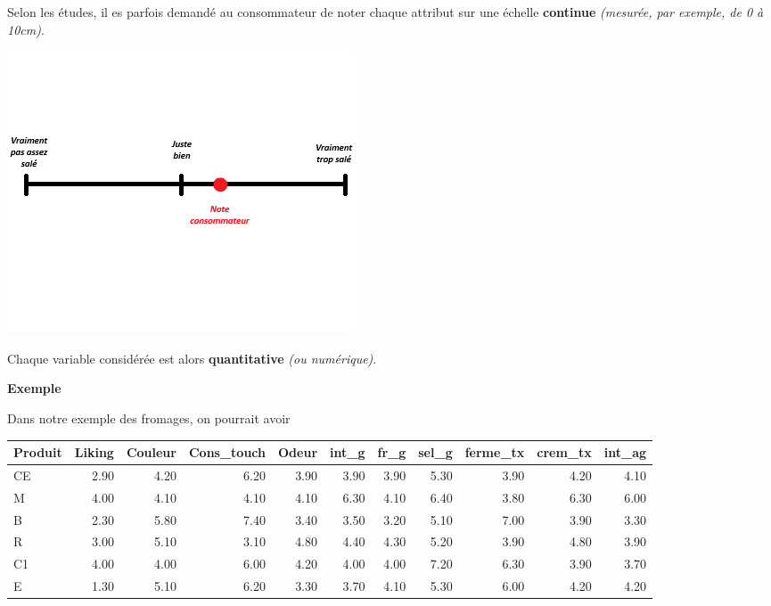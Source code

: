 \documentclass[aspectratio=169,xcolor=dvipsnames]{beamer}
\begin{document}
\begin{frame}

\textcolor{nyubluedarker}{\faCogs} Selon les études, il es parfois demandé au consommateur de noter chaque attribut sur une échelle \textbf{continue} \emph{(mesurée, par exemple, de 0 à 10cm)}.

	\begin{center}
	\includegraphics[scale=0.6]{ech_cont.png}
	\end{center}
\textcolor{nyubluedarker}{\faCogs} Chaque variable considérée est alors \textbf{quantitative} \emph{(ou numérique)}.
\end{frame}

\begin{frame}
	\begin{exampleblock}{\textbf{Exemple}}
	\begin{scriptsize}
	Dans notre exemple des fromages, on pourrait avoir
	\begin{center}
\begin{tabular}{lrrrrrrrrrr}
  \hline
Produit & Liking & Couleur & Cons\_touch & Odeur & int\_g & fr\_g & sel\_g & ferme\_tx & crem\_tx & int\_ag \\ 
  \hline
CE & 2.90 & 4.20 & 6.20 & 3.90 & 3.90 & 3.90 & 5.30 & 3.90 & 4.20 & 4.10 \\ 
M & 4.00 & 4.10 & 4.10 & 4.10 & 6.30 & 4.10 & 6.40 & 3.80 & 6.30 & 6.00 \\ 
B & 2.30 & 5.80 & 7.40 & 3.40 & 3.50 & 3.20 & 5.10 & 7.00 & 3.90 & 3.30 \\ 
R & 3.00 & 5.10 & 3.10 & 4.80 & 4.40 & 4.30 & 5.20 & 3.90 & 4.80 & 3.90 \\ 
C1 & 4.00 & 4.00 & 6.00 & 4.20 & 4.00 & 4.00 & 7.20 & 6.30 & 3.90 & 3.70 \\ 
E & 1.30 & 5.10 & 6.20 & 3.30 & 3.70 & 4.10 & 5.30 & 6.00 & 4.20 & 4.20 \\ 
   \hline
\end{tabular}
	\end{center}
	\end{scriptsize}
	\end{exampleblock}
\end{frame}
\end{document}

